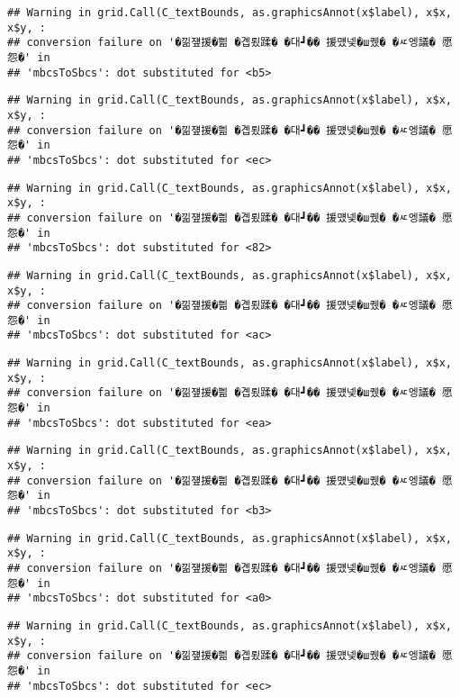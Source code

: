 \documentclass[
]{article}
\begin{document}
\begin{verbatim}
## Warning in grid.Call(C_textBounds, as.graphicsAnnot(x$label), x$x, x$y, :
## conversion failure on '�낆쟾援�쁾 �곕룄蹂� �대┛�� 援먰넻�ш퀬� �ㅼ엥議� 愿怨�' in
## 'mbcsToSbcs': dot substituted for <b5>
\end{verbatim}

\begin{verbatim}
## Warning in grid.Call(C_textBounds, as.graphicsAnnot(x$label), x$x, x$y, :
## conversion failure on '�낆쟾援�쁾 �곕룄蹂� �대┛�� 援먰넻�ш퀬� �ㅼ엥議� 愿怨�' in
## 'mbcsToSbcs': dot substituted for <ec>
\end{verbatim}

\begin{verbatim}
## Warning in grid.Call(C_textBounds, as.graphicsAnnot(x$label), x$x, x$y, :
## conversion failure on '�낆쟾援�쁾 �곕룄蹂� �대┛�� 援먰넻�ш퀬� �ㅼ엥議� 愿怨�' in
## 'mbcsToSbcs': dot substituted for <82>
\end{verbatim}

\begin{verbatim}
## Warning in grid.Call(C_textBounds, as.graphicsAnnot(x$label), x$x, x$y, :
## conversion failure on '�낆쟾援�쁾 �곕룄蹂� �대┛�� 援먰넻�ш퀬� �ㅼ엥議� 愿怨�' in
## 'mbcsToSbcs': dot substituted for <ac>
\end{verbatim}

\begin{verbatim}
## Warning in grid.Call(C_textBounds, as.graphicsAnnot(x$label), x$x, x$y, :
## conversion failure on '�낆쟾援�쁾 �곕룄蹂� �대┛�� 援먰넻�ш퀬� �ㅼ엥議� 愿怨�' in
## 'mbcsToSbcs': dot substituted for <ea>
\end{verbatim}

\begin{verbatim}
## Warning in grid.Call(C_textBounds, as.graphicsAnnot(x$label), x$x, x$y, :
## conversion failure on '�낆쟾援�쁾 �곕룄蹂� �대┛�� 援먰넻�ш퀬� �ㅼ엥議� 愿怨�' in
## 'mbcsToSbcs': dot substituted for <b3>
\end{verbatim}

\begin{verbatim}
## Warning in grid.Call(C_textBounds, as.graphicsAnnot(x$label), x$x, x$y, :
## conversion failure on '�낆쟾援�쁾 �곕룄蹂� �대┛�� 援먰넻�ш퀬� �ㅼ엥議� 愿怨�' in
## 'mbcsToSbcs': dot substituted for <a0>
\end{verbatim}

\begin{verbatim}
## Warning in grid.Call(C_textBounds, as.graphicsAnnot(x$label), x$x, x$y, :
## conversion failure on '�낆쟾援�쁾 �곕룄蹂� �대┛�� 援먰넻�ш퀬� �ㅼ엥議� 愿怨�' in
## 'mbcsToSbcs': dot substituted for <ec>
\end{verbatim}
\end{document}

